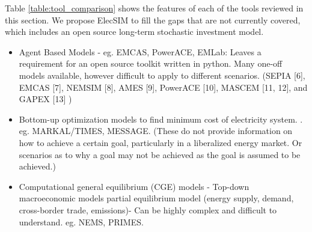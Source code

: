 Table \ref{table:tool_comparison} shows the features of each of the tools reviewed in this section. We propose ElecSIM to fill the gaps that are not currently covered, which includes an open source long-term stochastic investment model. 

\begin{itemize}
	\item Agent Based Models - eg. EMCAS, PowerACE, EMLab: Leaves a requirement for an open source toolkit written in python. Many one-off models available, however difficult to apply to different scenarios.
	(SEPIA [6], EMCAS [7], NEMSIM [8], AMES [9], PowerACE [10], MASCEM [11, 12], and GAPEX [13] \cite{Lopes})
	\item Bottom-up optimization models to find minimum cost of electricity system. \cite{Pfenninger2014}. eg. MARKAL/TIMES, MESSAGE. (These do not provide information on how to achieve a certain goal, particularly in a liberalized energy market. Or scenarios as to why a goal may not be achieved as the goal is assumed to be achieved.)
	\item Computational general equilibrium (CGE) models - Top-down macroeconomic models partial equilibrium model (energy supply, demand, cross-border trade, emissions)- Can be highly complex and difficult to understand. eg. NEMS, PRIMES.
\end{itemize}



